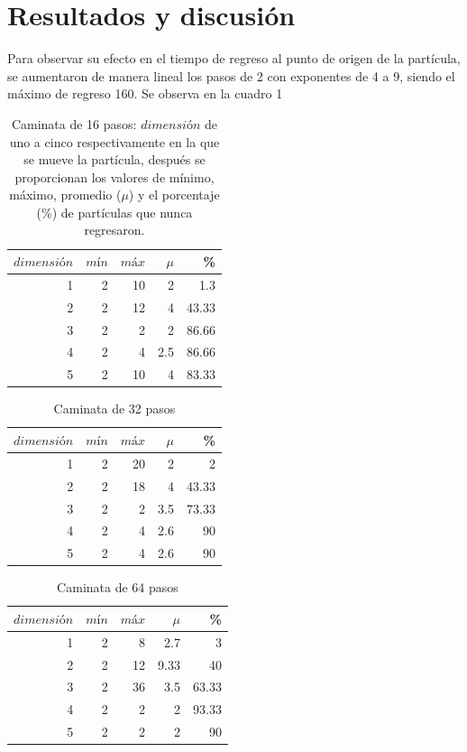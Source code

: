 \documentclass[12pt]{amsart}
\begin{document}
\section{Resultados y discusión}
Para observar su efecto en el tiempo de regreso al punto de origen de la partícula, se aumentaron de manera lineal los pasos de 2 con exponentes de 4 a 9, siendo el máximo de regreso 160.
Se observa en la cuadro 1 
{
\begin{table}[ht]
    \caption{Caminata de 16 pasos: $dimensión$ de uno a cinco respectivamente en la que se mueve la partícula, después se proporcionan los valores de mínimo, máximo, promedio ($\mu$) y el porcentaje (\%) de partículas que nunca regresaron.}
    \label{datos}
    \centering
    \begin{tabular}{|r|rrr|r|}
       \hline
        $dimensión$&$mín$&$máx$&$\mu$&\% \\
        \hline
        1 & 2 & 10 & 2 & 1.3 \\
        2 & 2 & 12 & 4 & 43.33 \\
        3 & 2 & 2 & 2 & 86.66 \\
        4 & 2 & 4 & 2.5 & 86.66 \\
        5 & 2 & 10 & 4 & 83.33\\
        \hline
    \end{tabular}
\end{table}
\bigskip

\begin{table}[ht]
    \caption{Caminata de 32 pasos}
    \label{datos}
    \centering
    \begin{tabular}{|r|rrr|r|}
       \hline
        $dimensión$&$mín$&$máx$&$\mu$&\% \\
        \hline
        1 & 2 & 20 & 2 & 2 \\
        2 & 2 & 18 & 4 & 43.33 \\
        3 & 2 & 2 & 3.5 & 73.33 \\
        4 & 2 & 4 & 2.6 & 90 \\
        5 & 2 & 4 & 2.6 & 90\\
        \hline
    \end{tabular}
\end{table}
\bigskip

\begin{table}[ht]
    \caption{Caminata de 64 pasos}
    \label{datos}
    \centering
    \begin{tabular}{|r|rrr|r|}
       \hline
        $dimensión$&$mín$&$máx$&$\mu$&\% \\
        \hline
        1 & 2 & 8 & 2.7 & 3 \\
        2 & 2 & 12 & 9.33 & 40 \\
        3 & 2 & 36 & 3.5 & 63.33 \\
        4 & 2 & 2 & 2 & 93.33 \\
        5 & 2 & 2 & 2 & 90\\
        \hline
    \end{tabular}
\end{table}
\bigskip

}
\end{document}
